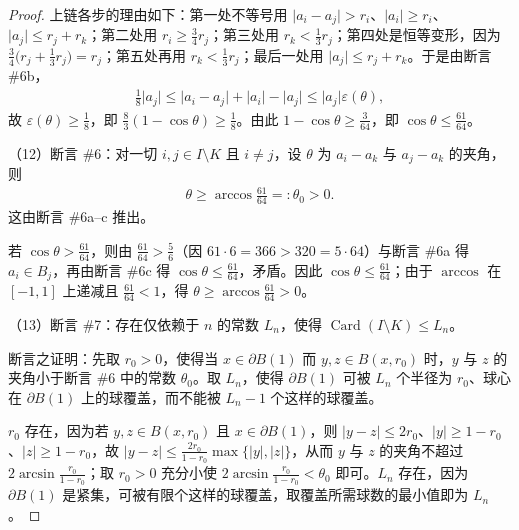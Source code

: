 \documentclass[../../main.tex]{subfiles}%
\begin{document}
\begin{proof}
上链各步的理由如下：第一处不等号用 $\lvert a_i-a_j\rvert>r_i$、$\lvert a_i\rvert\geqslant r_i$、$\lvert a_j\rvert\leqslant r_j+r_k$；第二处用 $r_i\geqslant\frac{3}{4}r_j$；第三处用 $r_k<\frac{1}{3}r_j$；第四处是恒等变形，因为 $\frac{3}{4}\bigl(r_j+\frac{1}{3}r_j\bigr)=r_j$；第五处再用 $r_k<\frac{1}{3}r_j$；最后一处用 $\lvert a_j\rvert\leqslant r_j+r_k$。于是由断言 \#6b，
\begin{align*}
\frac{1}{8}\lvert a_j\rvert\leqslant\lvert a_i-a_j\rvert+\lvert a_i\rvert-\lvert a_j\rvert\leqslant\lvert a_j\rvert\varepsilon(\theta),
\end{align*}
故 $\varepsilon(\theta)\geqslant\frac{1}{8}$，即 $\frac{8}{3}(1-\cos\theta)\geqslant\frac{1}{8}$。由此 $1-\cos\theta\geqslant\frac{3}{64}$，即 $\cos\theta\leqslant\frac{61}{64}$。

（12）断言 \#6：对一切 $i,j\in I\setminus K$ 且 $i\neq j$，设 $\theta$ 为 $a_i-a_k$ 与 $a_j-a_k$ 的夹角，则
\begin{align*}
\theta\geqslant\arccos\frac{61}{64}=:\theta_0>0 .
\end{align*}
这由断言 \#6a–c 推出。

若 $\cos\theta>\frac{61}{64}$，则由 $\frac{61}{64}>\frac{5}{6}$（因 $61\cdot6=366>320=5\cdot64$）与断言 \#6a 得 $a_i\in B_j$，再由断言 \#6c 得 $\cos\theta\leqslant\frac{61}{64}$，矛盾。因此 $\cos\theta\leqslant\frac{61}{64}$；由于 $\arccos$ 在 $[-1,1]$ 上递减且 $\frac{61}{64}<1$，得 $\theta\geqslant\arccos\frac{61}{64}>0$。

（13）断言 \#7：存在仅依赖于 $n$ 的常数 $L_n$，使得 $\operatorname{Card}(I\setminus K)\leqslant L_n$。

断言之证明：先取 $r_0>0$，使得当 $x\in\partial B(1)$ 而 $y,z\in B(x,r_0)$ 时，$y$ 与 $z$ 的夹角小于断言 \#6 中的常数 $\theta_0$。取 $L_n$，使得 $\partial B(1)$ 可被 $L_n$ 个半径为 $r_0$、球心在 $\partial B(1)$ 上的球覆盖，而不能被 $L_n-1$ 个这样的球覆盖。

$r_0$ 存在，因为若 $y,z\in B(x,r_0)$ 且 $x\in\partial B(1)$，则 $\lvert y-z\rvert\leqslant2r_0$、$\lvert y\rvert\geqslant1-r_0$、$\lvert z\rvert\geqslant1-r_0$，故 $\lvert y-z\rvert\leqslant\frac{2r_0}{1-r_0}\max\{\lvert y\rvert,\lvert z\rvert\}$，从而 $y$ 与 $z$ 的夹角不超过 $2\arcsin\frac{r_0}{1-r_0}$；取 $r_0>0$ 充分小使 $2\arcsin\frac{r_0}{1-r_0}<\theta_0$ 即可。$L_n$ 存在，因为 $\partial B(1)$ 是紧集，可被有限个这样的球覆盖，取覆盖所需球数的最小值即为 $L_n$。


\end{proof}
\end{document}

